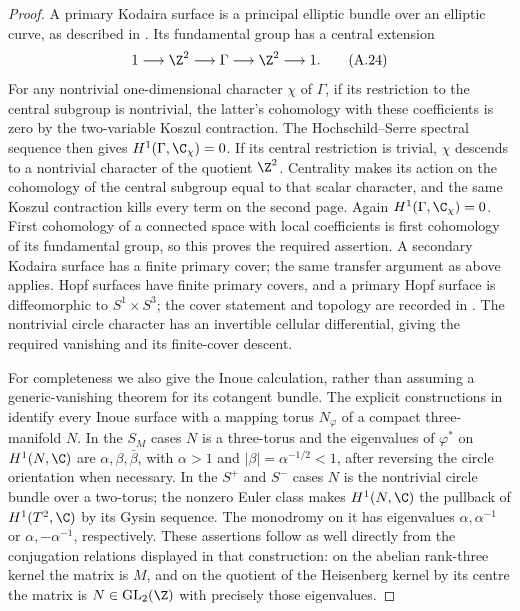 \begin{proof}
A primary Kodaira surface is a principal elliptic bundle over an elliptic curve, as described in \cite[\S1 and the central-extension diagram in the proof of Lemma~1.1]{SS2002}. Its fundamental group has a central extension
\[
 1\longrightarrow\Z^2\longrightarrow\Gamma\longrightarrow\Z^2
       \longrightarrow1.
 \tag{A.24}
\]
For any nontrivial one-dimensional character $\chi$ of $\Gamma$, if its restriction to the central subgroup is nontrivial, the latter's cohomology with these coefficients is zero by the two-variable Koszul contraction. The Hochschild--Serre spectral sequence then gives $H^1(\Gamma,\C_\chi)=0$. If its central restriction is trivial, $\chi$ descends to a nontrivial character of the quotient $\Z^2$. Centrality makes its action on the cohomology of the central subgroup equal to that scalar character, and the same Koszul contraction kills every term on the second page. Again $H^1(\Gamma,\C_\chi)=0$. First cohomology of a connected space with local coefficients is first cohomology of its fundamental group, so this proves the required assertion. A secondary Kodaira surface has a finite primary cover; the same transfer argument as above applies. Hopf surfaces have finite primary covers, and a primary Hopf surface is diffeomorphic to $S^1\times S^3$; the cover statement and topology are recorded in \cite[\S2.1.1 and Theorem~2.2]{Albanese2020}. The nontrivial circle character has an invertible cellular differential, giving the required vanishing and its finite-cover descent.

For completeness we also give the Inoue calculation, rather than assuming a generic-vanishing theorem for its cotangent bundle. The explicit constructions in \cite[\S2.1.2 and Proposition~2.3]{Albanese2020} identify every Inoue surface with a mapping torus $N_\varphi$ of a compact three-manifold $N$. In the $S_M$ cases $N$ is a three-torus and the eigenvalues of $\varphi^*$ on $H^1(N,\C)$ are $\alpha,\beta,\bar\beta$, with $\alpha>1$ and $|\beta|=\alpha^{-1/2}<1$, after reversing the circle orientation when necessary. In the $S^+$ and $S^-$ cases $N$ is the nontrivial circle bundle over a two-torus; the nonzero Euler class makes $H^1(N,\C)$ the pullback of $H^1(T^2,\C)$ by its Gysin sequence. The monodromy on it has eigenvalues $\alpha,\alpha^{-1}$ or $\alpha,-\alpha^{-1}$, respectively. These assertions follow as well directly from the conjugation relations displayed in that construction: on the abelian rank-three kernel the matrix is $M$, and on the quotient of the Heisenberg kernel by its centre the matrix is $N\in\mathrm{GL}_2(\Z)$ with precisely those eigenvalues.


\end{proof}
